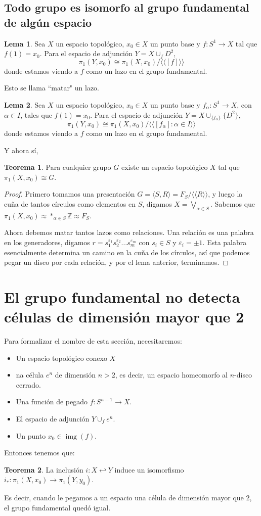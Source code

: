 \documentclass[spanish]{book}
\theoremstyle{definition}
\newtheorem*{lema}{Lema}
\newtheorem*{teo}{Teorema}
\newcommand{\Z}{\mathbb{Z}}
\DeclareMathOperator{\img}{img}
\begin{document}
\subsection{Todo grupo es isomorfo al grupo fundamental de algún espacio}
	\begin{lema}
		Sea $X$ un espacio topológico, $x_0\in X$ un punto base y $f:S^1\to X$ tal que $f(1)=x_0$. Para el espacio de adjunción $Y=X\cup_f D^2$,
		\[\pi_1(Y,x_0)\cong\pi_1(X,x_0)\big/\langle\langle [f]\rangle\rangle\]
		donde estamos viendo a $f$ como un lazo en el grupo fundamental.
	\end{lema}
	Esto se llama ``matar" un lazo.
	\begin{lema}
		Sea $X$ un espacio topológico, $x_0\in X$ un punto base y $f_\alpha:S^1\to X$, con $\alpha\in I$, tales que $f(1)=x_0$. Para el espacio de adjunción $Y=X\cup_{\{f_\alpha\}} \{D^2\}$,
		\[\pi_1(Y,x_0)\cong\pi_1(X,x_0)\big/\langle\langle [f_\alpha]:\alpha\in I\rangle\rangle\]
		donde estamos viendo a $f$ como un lazo en el grupo fundamental.
	\end{lema}
	Y ahora sí,
	\begin{teo}
		Para cualquier grupo $G$ existe un espacio topológico $X$ tal que $\pi_1(X,x_0)\cong G$.
	\end{teo}
	\begin{proof}
		Primero tomamos una presentación  $G=\langle S,R\rangle=F_S/\langle\langle R\rangle\rangle$, y luego la cuña de tantos círculos como elementos en $S$, digamos $X=\bigvee_{\alpha\in S}$. Sabemos que $\pi_1(X,x_0)\approx *_{\alpha\in S}\Z\approx F_S$.
		
		Ahora debemos matar tantos lazos como relaciones. Una relación es una palabra en los generadores, digamos $r=s_1^{\varepsilon_1}s_2^{\varepsilon_2}\ldots s_m^{\varepsilon_m}$ con $s_i\in S$ y $\varepsilon_i=\pm1$. Esta palabra esencialmente determina un camino en la cuña de los círculos, así que podemos pegar un disco por cada relación, y por el lema anterior, terminamos.
	\end{proof}
	
\section{El grupo fundamental no detecta células de dimensión mayor que 2}
	Para formalizar el nombre de esta sección, necesitaremos: 
	\begin{itemize}
		\item Un espacio topológico conexo $X$
		\item na célula $e^n$ de dimensión $n>2$, es decir, un espacio homeomorfo al $n$-disco cerrado.
		\item Una función de pegado $f:S^{n-1}\to X$.
		\item El espacio de adjunción $Y\cup_f e^n$.
		\item Un punto $x_0\in\img(f)$.
	\end{itemize}
	Entonces tenemos que:
	\begin{teo}
		La inclusión $i:X\hookleftarrow Y$ induce un isomorfismo $i_*:\pi_1(X,x_0)\to\pi_1(Y,y_0)$.
	\end{teo}
	Es decir, cuando le pegamos a un espacio una célula de dimensión mayor que 2, el grupo fundamental quedó igual.
\end{document}
